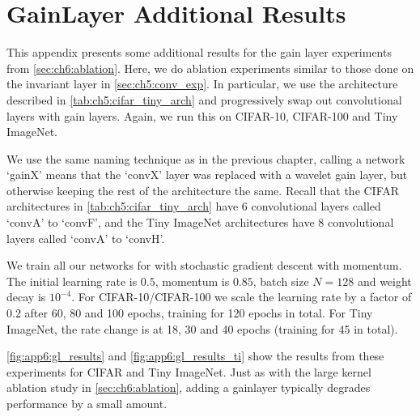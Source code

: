 \chapter{GainLayer Additional Results}\label{app:ch6:more_results}
This appendix presents some additional results for the gain layer experiments
from \autoref{sec:ch6:ablation}. Here, we do ablation experiments similar to
those done on the invariant layer in \autoref{sec:ch5:conv_exp}. In particular,
we use the architecture described in \autoref{tab:ch5:cifar_tiny_arch} and
progressively swap out convolutional layers with gain layers. 
Again, we run this on CIFAR-10, CIFAR-100 and Tiny ImageNet. 

We use the same naming technique as in the previous chapter, calling a network
`gainX' means that the `convX' layer was replaced with a wavelet gain layer, but
otherwise keeping the rest of the architecture the same. Recall that the
CIFAR architectures in \autoref{tab:ch5:cifar_tiny_arch} have 6 convolutional layers 
called `convA' to `convF', and the Tiny ImageNet architectures have 8
convolutional layers called `convA' to `convH'.

We train all our networks for with stochastic gradient descent with momentum.
The initial learning rate is $0.5$, momentum is $0.85$, batch size $N=128$ and
weight decay is $10^{-4}$. For CIFAR-10/CIFAR-100 we scale the learning rate by
a factor of 0.2 after 60, 80 and 100 epochs, training for 120 epochs in total.
For Tiny ImageNet, the rate change is at 18, 30 and 40 epochs (training for 45 in total).

\autoref{fig:app6:gl_results} and \autoref{fig:app6:gl_results_ti} show the results 
from these experiments for CIFAR and Tiny ImageNet. Just as with the large
kernel ablation study in \autoref{sec:ch6:ablation}, adding a gainlayer
typically degrades performance by a small amount.

\begin{figure}[t]
  \centering
  \\
  \label{fig:app6:gl_results}
\end{figure}

